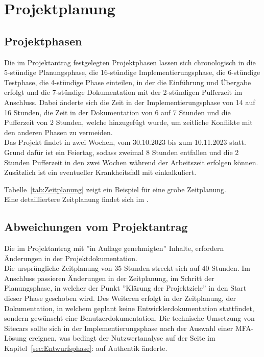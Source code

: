 \section{Projektplanung} 
\label{sec:Projektplanung}


\subsection{Projektphasen}
\label{sec:Projektphasen}
Die im Projektantrag festgelegten Projektphasen lassen sich chronologisch in die 5-stündige Planungsphase, 
die 16-stündige Implementierungsphase, die 6-stündige Testphase, die 4-stündige Phase einteilen, in der die 
Einführung und Übergabe erfolgt und die 7-stündige Dokumentation mit der 2-stündigen Pufferzeit im Anschluss.
Dabei änderte sich die Zeit in der Implementierungsphase von 14 auf 16 Stunden, die Zeit in der 
Dokumentation von 6 auf 7 Stunden und die Pufferzeit von 2 Stunden, welche hinzugefügt wurde, um zeitliche Konflikte mit 
den anderen Phasen zu vermeiden.
\\Das Projekt findet in zwei Wochen, vom 30.10.2023 bis zum 10.11.2023 statt. Grund dafür ist ein Feiertag, 
sodass zweimal 8 Stunden entfallen und die 2 Stunden Pufferzeit in den zwei Wochen während der Arbeitszeit 
erfolgen können. Zusätzlich ist ein eventueller Krankheitsfall mit einkalkuliert.

Tabelle~\ref{tab:Zeitplanung} zeigt ein Beispiel für eine grobe Zeitplanung.
\\
Eine detailliertere Zeitplanung findet sich im .


\subsection{Abweichungen vom Projektantrag}
\label{sec:AbweichungenProjektantrag}

Die im Projektantrag mit ''in Auflage genehmigten'' Inhalte, erfordern Änderungen in der Projektdokumentation. 
\\Die ursprüngliche Zeitplanung von 35 Stunden streckt sich auf 40 Stunden.
Im Anschluss passieren Änderungen in der Zeitplanung, im Schritt der Planungsphase, in welcher der Punkt ''Klärung der 
Projektziele'' in den Start dieser Phase geschoben wird. Des Weiteren erfolgt in der Zeitplanung, der 
Dokumentation, in welchem geplant keine Entwicklerdokumentation stattfindet, sondern gewünscht eine 
Benutzerdokumentation. Die technische Umsetzung von Sitecars sollte sich in der Implementierungsphase 
nach der Auswahl einer MFA-Lösung ereignen, was bedingt der Nutzwertanalyse auf der Seite 
\pageref{sec:Authentifizierungs-Tool} im Kapitel~\ref{sec:Entwurfsphase}:  
auf Authentik änderte.


